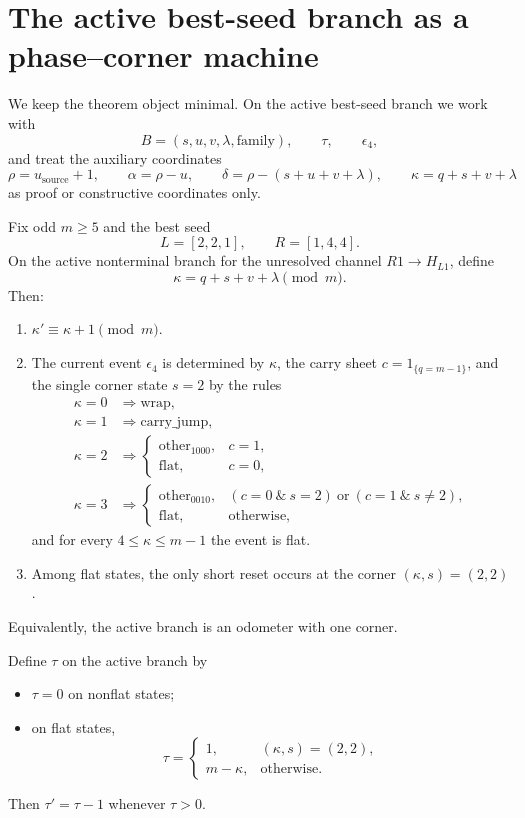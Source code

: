 \section{The active best-seed branch as a phase--corner machine}

We keep the theorem object minimal. On the active best-seed branch we work with
\[
B=(s,u,v,\lambda,\mathrm{family}),\qquad \tau,\qquad \epsilon_4,
\]
and treat the auxiliary coordinates
\[
\rho=u_{\mathrm{source}}+1,
\qquad
\alpha=\rho-u,
\qquad
\delta=\rho-(s+u+v+\lambda),
\qquad
\kappa=q+s+v+\lambda
\]
as proof or constructive coordinates only.

\begin{theorem}
Fix odd $m\ge 5$ and the best seed
\[
L=[2,2,1],\qquad R=[1,4,4].
\]
On the active nonterminal branch for the unresolved channel $R1\to H_{L1}$,
define
\[
\kappa=q+s+v+\lambda\pmod m.
\]
Then:
\begin{enumerate}
    \item $\kappa'\equiv \kappa+1\pmod m$.
    \item The current event $\epsilon_4$ is determined by $\kappa$, the carry
    sheet $c=1_{\{q=m-1\}}$, and the single corner state $s=2$ by the rules
    \begin{align*}
    \kappa=0 &\Rightarrow \mathrm{wrap},\\
    \kappa=1 &\Rightarrow \mathrm{carry\_jump},\\
    \kappa=2 &\Rightarrow
    \begin{cases}
    \mathrm{other}_{1000},& c=1,\\
    \mathrm{flat},& c=0,
    \end{cases}\\
    \kappa=3 &\Rightarrow
    \begin{cases}
    \mathrm{other}_{0010},& (c=0\ \&\ s=2)\ \text{or}\ (c=1\ \&\ s\ne 2),\\
    \mathrm{flat},& \text{otherwise},
    \end{cases}
    \end{align*}
    and for every $4\le \kappa\le m-1$ the event is flat.
    \item Among flat states, the only short reset occurs at the corner
    $(\kappa,s)=(2,2)$.
\end{enumerate}
Equivalently, the active branch is an odometer with one corner.
\end{theorem}

\begin{corollary}
Define $\tau$ on the active branch by
\begin{itemize}
    \item $\tau=0$ on nonflat states;
    \item on flat states,
    \[
    \tau=
    \begin{cases}
    1,& (\kappa,s)=(2,2),\\
    m-\kappa,& \text{otherwise}.
    \end{cases}
    \]
\end{itemize}
Then $\tau'=\tau-1$ whenever $\tau>0$.
\end{corollary}

